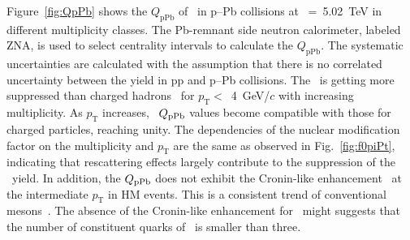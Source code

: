 Figure~\ref{fig:QpPb} shows the $Q_{\mbox{pPb}}$ of \fzero~in p--Pb collisions at \snn~=~5.02~TeV in different multiplicity classes. The Pb-remnant side neutron calorimeter, labeled ZNA, is used to select centrality intervals to calculate the $Q_{\mathrm{pPb}}$. The systematic uncertainties are calculated with the assumption that there is no correlated uncertainty between the yield in pp and p--Pb collisions. The \fzero~is getting more suppressed than charged hadrons~\cite{ALICE:2014xsp} for $p_{\mathrm{T}}<$~4~GeV/$c$ with increasing multiplicity. As $p_{\mathrm{T}}$ increases, \fzero~$Q_{\rm{pPb}}$ values become compatible with those for charged particles, reaching unity. The dependencies of the nuclear modification factor on the multiplicity and $p_{\mathrm{T}}$ are the same as observed in Fig.~\ref{fig:f0piPt}, indicating that rescattering effects largely contribute to the suppression of the \fzero~yield. In addition, the $Q_{\rm{pPb}}$ does not exhibit the Cronin-like enhancement~\cite{Cronin:1974zm} at the intermediate $p_{\mathrm{T}}$ in HM events. This is a consistent trend of conventional mesons~\cite{ALICE:2016dei}. The absence of the Cronin-like enhancement for \fzero~might suggests that the number of constituent quarks of \fzero~is smaller than three.